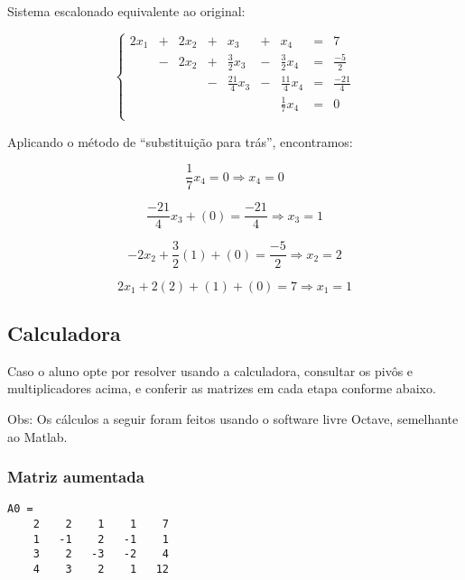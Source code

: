 \documentclass[a4paper]{article}
\begin{document}
Sistema escalonado equivalente ao original:

\begin{displaymath}
  \left\{
    \begin{array}{ccccccccc}
      2 x_1 &+& 2 x_2  &+&  x_3 &+& x_4 &=&7\\
      & -& 2 x_2 &+& \frac{3}{2} x_3 &-& \frac{3}{2} x_4 &=&\frac{-5}{2}\\
      & & &-& \frac{21}{4} x_3 &-& \frac{11}{4} x_4&=& \frac{-21}{4}\\
      & & & &  & & \frac{1}{7}x_4 &=&0\\
    \end{array}
\right.
\end{displaymath}

Aplicando o método de ``substituição para trás'', encontramos:

\begin{displaymath}
  \frac{1}{7} x_4 = 0 \Rightarrow x_4 = 0
\end{displaymath}

\begin{displaymath}
  \frac{-21}{4} x_3 + (0) = \frac{-21}{4} \Rightarrow  x_3 = 1
\end{displaymath}

\begin{displaymath}
  -2 x_2 + \frac{3}{2} (1) + (0) = \frac{-5}{2} \Rightarrow x_2 = 2
\end{displaymath}

\begin{displaymath}
  2 x_1 + 2 (2) + (1) + (0) = 7 \Rightarrow x_1 = 1
\end{displaymath}


\newpage
\subsection{Calculadora}

Caso o aluno opte por resolver usando a calculadora, consultar os
pivôs e multiplicadores acima, e conferir as matrizes em cada etapa
conforme abaixo.

Obs: Os cálculos a seguir foram feitos usando o software livre Octave,
semelhante ao Matlab.

\subsubsection{Matriz aumentada}

\begin{verbatim}
A0 =
    2    2    1    1    7
    1   -1    2   -1    1
    3    2   -3   -2    4
    4    3    2    1   12
\end{verbatim}
\end{document}

